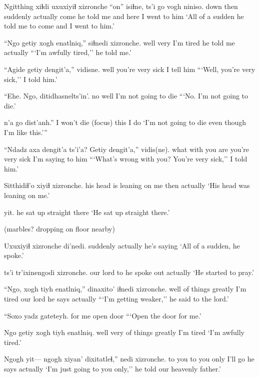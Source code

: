 \documentclass[12pt]{article}
\begin{document}
\gll Ngitthing xiɬdi uxuxiyiɬ xizronche ``on'' isiɬne, ts'i go {vogh niniso.} 
down      then  suddenly actually    come {he told me} and here {I went to him}
\glt `All of a sudden he told me to come and I went to him.'
\glend

\gll ``Ngo getiy {xogh enatlniq,''} siɬnedi xizronche.
well very {I'm tired} {he told me } actually
\glt ```I'm awfully tired,'' he told me.'
\glend

\gll ``Agide {getiy dengit'a,''} vidisne. 
well  {you're very sick} {I tell him}
\glt ```Well, you're very sick,'' I told him.'
\glend

\gll ``Ehe. Ngo, {ditidhasnelts'in'. }
no     well {I'm not going to die}
\glt ```No. I'm not going to die.'
\glend

 n'a go dist'anh.''
{I won't die} {(focus)} this {I do}
\glt `I'm not going to die even though I'm like this.'''
\glend

\gll ``Ndadz axa dengit'a ts'i'a? {Getiy dengit'a,}'' vidis(ne).
what  with {you are} {}       {you're very sick} {I'm saying to him}
\glt ```What's wrong with you? You're very sick,'' I told him.'
\glend

\gll Sitthidiɬ'o xiyiɬ xizronche.
{his head is leaning on me} then actually
\glt `His head was leaning on me.'
\glend

 yit. 
{he sat up straight} there
\glt `He sat up straight there.'
\glend

(marbles? dropping on floor nearby)

\gll Uxuxiyiɬ xizronche di'nedi.  
suddenly actually       {he's saying} 
\glt `All of a sudden, he spoke.'
\glend

 ts'i tr'ixinengodi xizronche.
{our lord}  to   {he spoke out} actually
\glt  `He started to pray.'
\glend

\gll ``Ngo, xogh tiyh enatlniq,'' dinaxito' iɬnedi xizronche. 
well {of things} greatly {I'm tired} {our lord} {he says} actually
\glt ```I'm getting weaker,'' he said to the lord.'
\glend

\gll ``Soxo {yadz gateteyh. }
{for me} {open door}
\glt ```Open the door for me.'
\glend

\gll Ngo getiy xogh tiyh enatlniq. 
well very {of things} greatly {I'm tired}
\glt `I'm awfully tired.'
\glend

\gll Ngogh yit--- ngogh xiyan' dixitatleɬ,'' nedi xizronche. 
{to you} {} {to you} only {I'll go} {he says} actually
\glt `I'm just going to you only,'' he told our heavenly father.'
\glend
\end{document}
